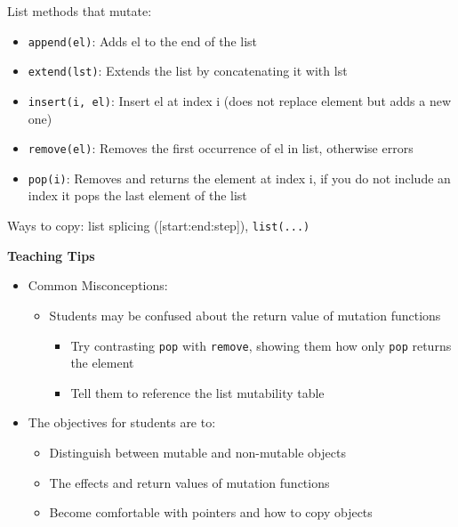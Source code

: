 List methods that mutate:
\begin{itemize}
\item \lstinline{append(el)}: Adds el to the end of the list
\item \lstinline{extend(lst)}: Extends the list by concatenating it with lst
\item \lstinline{insert(i, el)}: Insert el at index i (does not replace element but adds a new one)
\item \lstinline{remove(el)}: Removes the first occurrence of el in list, otherwise errors
\item \lstinline{pop(i)}: Removes and returns the element at index i, if you do not include an index it pops the last element of the list
\end{itemize}
Ways to copy: list splicing ([start:end:step]), \lstinline{list(...)}


\begin{guide}
	\begin{blocksection}
	\textbf{Teaching Tips}
	\begin{itemize}
			\item Common Misconceptions:
			\begin{itemize}
				\item Students may be confused about the return value of mutation functions
				\begin{itemize}
					\item Try contrasting \lstinline{pop} with \lstinline{remove}, showing them how only \lstinline{pop} returns the element
					\item Tell them to reference the list mutability table
				\end{itemize}
			\end{itemize}
			\item The objectives for students are to:
			\begin{itemize}
				\item Distinguish between mutable and non-mutable objects
				\item The effects and return values of mutation functions
				\item Become comfortable with pointers and how to copy objects
			\end{itemize}
	\end{itemize}
	\end{blocksection}
\end{guide}
